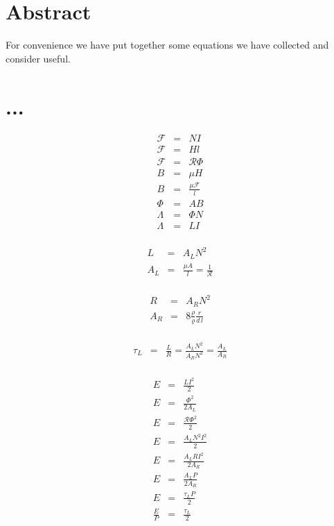 
\section{Abstract}

For convenience we have put together some equations we have collected and consider useful.

\section{...}

\begin{eqnarray}
\mathcal{F} &=& N I \\
\mathcal{F} &=& H l \\
\mathcal{F} &=& \mathcal{R} \Phi \\
B &=& \mu H \\
B &=& \frac{\mu \mathcal{F}}{l} \\
\Phi &=& A B \\
\Lambda &=& \Phi N \\
\Lambda &=& L I \\
\end{eqnarray}

\begin{eqnarray}
L &=& A_L N^2 \\
A_L &=& \frac{\mu A}{l} = \frac{1}{\mathcal{R}} \\
\end{eqnarray}

\begin{eqnarray}
R &=& A_R N^2 \\
A_R &=& 8 \frac{\rho}{\varrho} \frac{r}{d \, l} \\
\end{eqnarray}

\begin{eqnarray}
\tau_L &=& \frac{L}{R} = \frac{A_L N^2}{A_R N^2} = \frac{A_L}{A_R} \\
\end{eqnarray}

\begin{eqnarray}
E &=& \frac{L I^2}{2} \\
E &=& \frac{{\Phi}^2}{2 A_L} \\
E &=& \frac{\mathcal{R}{\Phi}^2}{2} \\
E &=& \frac{A_L N^2 I^2}{2} \\
E &=& \frac{A_L R I^2}{2 A_R} \\
E &=& \frac{A_L P}{2 A_R} \\
E &=& \frac{\tau_L P}{2} \\
\frac{E}{P} &=& \frac{\tau_L}{2} \\
\end{eqnarray}

